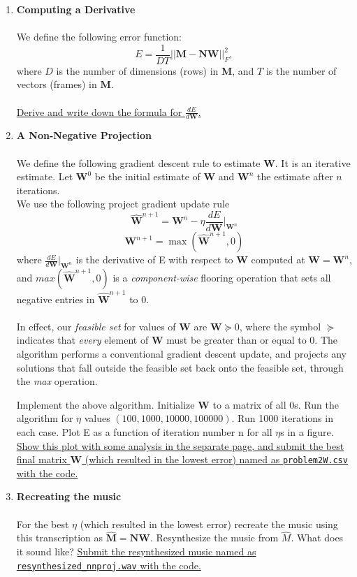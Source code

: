 \begin{enumerate}

\item \textbf{Computing a Derivative}\\ \\
We define the following error function: \\
$$E = \frac{1}{DT} ||\mathbf{M-NW}||^2_F,$$
where $D$ is the number of dimensions (rows) in $\mathbf{M}$, and $T$ is the number of vectors (frames) in $\mathbf{M}$. \\
\\
\ul{Derive and write down the formula for $\frac{dE}{d\mathbf{W}}$.}
\\
\item \textbf{A Non-Negative Projection}\\ \\
We define the following gradient descent rule to estimate $\mathbf{W}$. It is an iterative estimate. Let $\mathbf{W}^0$ be the initial estimate of $\mathbf{W}$ and $\mathbf{W}^n$ the estimate after $n$ iterations. \\
We use the following project gradient update rule
$$
\hat{\mathbf{W}}^{n+1} = \mathbf{W}^n - \eta \frac{dE}{d\mathbf{W}} |_{\mathbf{W}^n}
$$
$$
\mathbf{W}^{n+1} = \max (\hat{\mathbf{W}}^{n+1},0)
$$
where $\frac{dE}{d\mathbf{W}}|_{\mathbf{W}^{n}}$ is the derivative of E with respect to $\mathbf{W}$ computed at $\mathbf{W} = \mathbf{W}^{n}$, and $max(\mathbf{\hat{W}}^{n+1},0)$ is a \textit{component-wise} flooring operation that sets all negative entries in $\mathbf{\hat{W}}^{n+1}$ to 0.
\\
\\
In effect, our \textit{feasible set} for values of $\mathbf{W}$ are $\mathbf{W}\succeq 0$, where the symbol $\succeq$ indicates that \textit{every} element of $\mathbf{W}$ must be greater than or equal to 0. The algorithm performs a conventional gradient descent update, and projects any solutions that fall outside the feasible set back onto the feasible set, through the \textit{max} operation.

Implement the above algorithm. Initialize $\mathbf{W}$ to a matrix of all 0s. Run the algorithm for $\eta$ values $(100,1000,10000,100000)$. Run 1000 iterations in each case. Plot E as a function of iteration number n for all $\eta$s in a figure. \ul{Show  this plot with some analysis in the separate page, and submit the best final matrix $\mathbf{W}$ (which resulted in the lowest error) named as \texttt{problem2W.csv} with the code.}

\item \textbf{Recreating the music}%
\\
\\
For the best $\eta$ (which resulted in the lowest error) recreate the music using this transcription as $\mathbf{\hat{M}=NW}$. Resynthesize the music from $\hat{M}$. What does it sound like? \ul{Submit the resynthesized music named as \texttt{resynthesized\_nnproj.wav} with the code.}%

\end{enumerate}
